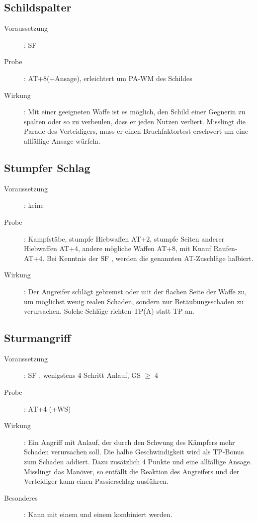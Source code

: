 \subsection{Schildspalter }
\label{chap.bAT.schildspalter}
\begin{description}
    \item[Voraussetzung]: SF 
    \item[Probe]: AT+8(+Ansage), erleichtert um PA-WM des Schildes
    \item[Wirkung]: Mit einer geeigneten Waffe ist es möglich, den Schild einer
        Gegnerin zu spalten oder so zu verbeulen, dass er jeden Nutzen
        verliert. Misslingt die Parade des Verteidigers, muss er einen
        Bruchfaktortest erschwert um eine allfällige Ansage würfeln.
\end{description}

\subsection{Stumpfer Schlag }
\label{chap.bAT.stumpf}
\begin{description}
    \item[Voraussetzung]: keine
    \item[Probe]: Kampfstäbe, stumpfe Hiebwaffen AT+2, stumpfe Seiten anderer
        Hiebwaffen AT+4, andere mögliche Waffen AT+8, mit Knauf Raufen-AT+4.
        Bei Kenntnis der SF , werden die
        genannten AT-Zuschläge halbiert.
    \item[Wirkung]: Der Angreifer schlägt gebremst oder mit der flachen Seite
        der Waffe zu, um möglichst wenig realen Schaden, sondern nur
        Betäubungsschaden zu verursachen. Solche Schläge richten TP(A) statt TP
        an.
\end{description}

\subsection{Sturmangriff }
\label{chap.bAT.sturmangriff}
\begin{description}
    \item[Voraussetzung]: SF , wenigstens 4 Schritt
        Anlauf, GS\textrm{ ${\geq}$ 4}
    \item[Probe]: AT+4 (+WS)
    \item[Wirkung]: Ein Angriff mit Anlauf, der durch den Schwung des Kämpfers
        mehr Schaden verursachen soll. Die halbe Geschwindigkeit wird als
        TP-Bonus zum Schaden addiert. Dazu zusätzlich 4 Punkte und eine
        allfällige Ansage. Misslingt das Manöver, so entfällt die Reaktion des
        Angreifers und der Verteidiger kann einen Passierschlag ausführen.
    \item[Besonderes]: Kann mit einem  und einem
         kombiniert werden.
\end{description}

